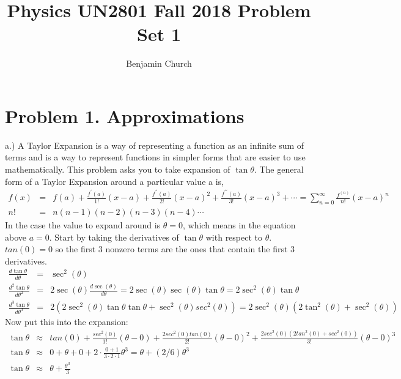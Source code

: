 \documentclass[11pt]{amsart}
\title{Physics UN2801 Fall 2018 Problem Set 1}
\author{Benjamin Church}
\begin{document}
\maketitle

\section{Problem 1. Approximations}

a.) A Taylor Expansion is a way of representing a function as an infinite sum of terms and is a way to represent functions in simpler forms that are easier to use mathematically. This problem asks you to take expansion of $\tan{\theta}$. The general form of a Taylor Expansion around a particular value a is, 
\begin{eqnarray*}
f(x) &=& f(a)+\frac{f^{'}(a)}{1!} (x-a)+\frac{f^{''}(a)}{2!}(x-a)^{2}+\frac{f^{'''}(a)}{3!}(x-a)^{3} + \cdots = \sum^{\infty}_{n=0} \frac{f^{(n)}}{n!}(x-a)^{n} 
\\
n! &=& n(n-1)(n-2)(n-3)(n-4) \cdots 
\end{eqnarray*} 
In the case the value to expand around is $\theta=0$, which means in the equation above $a=0$. Start by taking the derivatives of $\tan{\theta}$ with respect to $\theta$. $tan(0)=0$ so the first 3 nonzero terms are the ones that contain the first 3 derivatives. \\
\begin{eqnarray*}
\frac{d\tan{\theta}}{d\theta} &=& \sec^{2}(\theta) 
\\
\frac{d^{2}\tan{\theta}}{d\theta^{2}} &=& 2\sec(\theta)\frac{d \sec(\theta)}{d\theta} = 2\sec(\theta)\sec(\theta)\tan{\theta} = 2\sec^{2}(\theta)\tan{\theta} 
\\
\frac{d^{3}\tan{\theta}}{d\theta^{3}} &=& 2(2\sec^{2}(\theta)\tan{\theta}\tan{\theta} + \sec^{2}(\theta)sec^{2}(\theta)) = 2\sec^{2}(\theta)(2\tan^{2}(\theta) + \sec^{2}(\theta)) 
\end{eqnarray*} 
Now put this into the expansion: \\
\begin{eqnarray*} 
\tan{\theta} &\approx& tan(0) + \frac{sec^{2}(0)}{1!}(\theta-0) + \frac{2sec^{2}(0)tan(0)}{2!}(\theta-0)^{2} + \frac{2sec^{2}(0)(2tan^{2}(0) + sec^{2}(0))}{3!}(\theta-0)^{3} \nonumber \\
\tan{\theta} &\approx& 0 + \theta + 0 + 2\cdot \frac{0 + 1}{3 \cdot 2 \cdot 1}\theta^{3} = \theta + (2/6)\theta^{3}  \\
\tan{\theta} &\approx& \theta + \frac{\theta^{3}}{3}  
\end{eqnarray*}  \\
\end{document}
